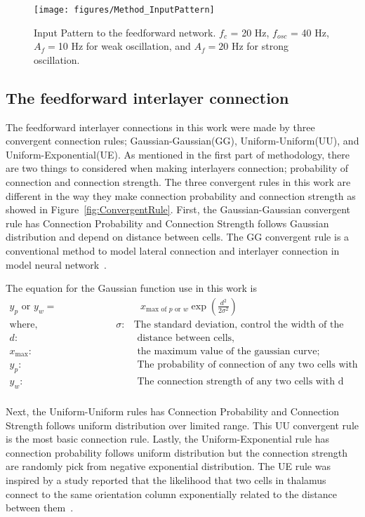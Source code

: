 \begin{figure}[!h]
	\centering
	\texttt{[image: figures/Method\_InputPattern]}
	\caption{Input Pattern to the feedforward network. $f_c$ = 20 Hz, $f_{osc}$ = 40 Hz,$A_f = $10 Hz for weak oscillation, and $A_f = 20$ Hz for strong oscillation.}
	\label{fig:InputFFN}
\end{figure} 

\subsection{The feedforward interlayer connection}
The feedforward interlayer connections in this work were made by three convergent connection rules; Gaussian-Gaussian(GG), Uniform-Uniform(UU), and Uniform-Exponential(UE). As mentioned in the first part of methodology, there are two things to considered when making interlayers connection; probability of connection and connection strength. The three convergent rules in this work are different in the way they make connection probability and connection strength as showed in Figure~\ref{fig:ConvergentRule}. First, the Gaussian-Gaussian convergent rule has Connection Probability and Connection Strength follows Gaussian distribution and depend on distance between cells. The GG convergent rule is a conventional method to model lateral connection and interlayer connection in model neural network~\cite{ringach2004haphazard,paik2009spontaneous, paik2010synaptic}. 


The equation for the Gaussian function use in this work is 
\begin{align*}
y_{p} \text{ or } y_{w} =&\text{  }x_{\text{max of }p\text{ or }w}\exp(\frac{d^2}{2 \sigma^2})\\
\text{where,} \hspace{8em} \sigma :& \text{The standard deviation, control the width of the Gaussian curve,}\\
	d:& \text{ distance between cells,} \\
	x_{\text{max}} :& \text{ the maximum value of the gaussian curve;} \\
	y_{p}:& \text{ The probability of connection of any two cells with d separation} \\
	y_{w}:& \text{ The connection strength of any two cells with d separation} \\
\end{align*}

Next, the Uniform-Uniform rules has Connection Probability and Connection Strength follows uniform distribution over limited range. This UU convergent rule is the most basic connection rule. Lastly, the Uniform-Exponential rule has connection probability follows uniform distribution but the connection strength are randomly pick from negative exponential distribution. The UE rule was inspired by a study reported that the likelihood that two cells in thalamus connect to the same orientation column exponentially related to the distance between them~\cite{jin2011population}.


